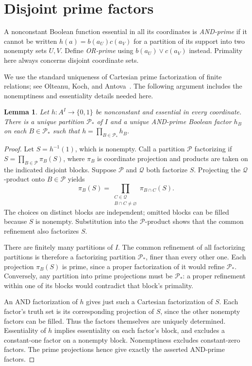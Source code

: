 \documentclass[11pt]{article}
\newtheorem{lemma}[theorem]{Lemma}
\begin{document}
\section{Disjoint prime factors}

A nonconstant Boolean function essential in all its coordinates is
\emph{AND-prime} if it cannot be written
$h(a)=b(a_U)c(a_V)$ for a partition of its support into two nonempty
sets $U,V$. Define \emph{OR-prime} using $b(a_U)\vee c(a_V)$ instead.
Primality here always concerns disjoint coordinate sets.

We use the standard uniqueness of Cartesian prime factorization of finite
relations; see Olteanu, Koch, and Antova~\cite[Section~6.1]{OlteanuKochAntova2008}.
The following argument includes the nonemptiness and essentiality details
needed here.

\begin{lemma}\label{lem:factor}
Let $h:A^I\to\{0,1\}$ be nonconstant and essential in every coordinate.
There is a unique partition $\mathcal P_*$ of $I$ and a unique AND-prime
Boolean factor $h_B$ on each $B\in\mathcal P_*$ such that
$h=\prod_{B\in\mathcal P_*}h_B$.
\end{lemma}
\begin{proof}
Let $S=h^{-1}(1)$, which is nonempty. Call a partition $\mathcal P$
factorizing if
$S=\prod_{B\in\mathcal P}\pi_B(S)$, where $\pi_B$ is coordinate
projection and products are taken on the indicated disjoint blocks.
Suppose $\mathcal P$ and $\mathcal Q$ both factorize $S$. Projecting
the $\mathcal Q$-product onto $B\in\mathcal P$ yields
\[
\pi_B(S)=\prod_{\substack{C\in\mathcal Q\\B\cap C\ne\varnothing}}
                       \pi_{B\cap C}(S).
\]
The choices on distinct blocks are independent; omitted blocks can be
filled because $S$ is nonempty. Substitution into the $\mathcal P$-product
shows that the common refinement also factorizes $S$.

There are finitely many partitions of $I$. The common refinement of all
factorizing partitions is therefore a factorizing partition $\mathcal P_*$,
finer than every other one. Each projection $\pi_B(S)$ is prime, since a
proper factorization of it would refine $\mathcal P_*$. Conversely, any
partition into prime projections must be $\mathcal P_*$: a proper
refinement within one of its blocks would contradict that block's
primality.

An AND factorization of $h$ gives just such a Cartesian factorization of
$S$. Each factor's truth set is its corresponding projection of $S$,
since the other nonempty factors can be filled. Thus the factors themselves
are uniquely determined. Essentiality of $h$ implies essentiality on each
factor's block, and excludes a constant-one factor on a nonempty block.
Nonemptiness excludes constant-zero factors. The prime projections hence
give exactly the asserted AND-prime factors.
\end{proof}
\end{document}
